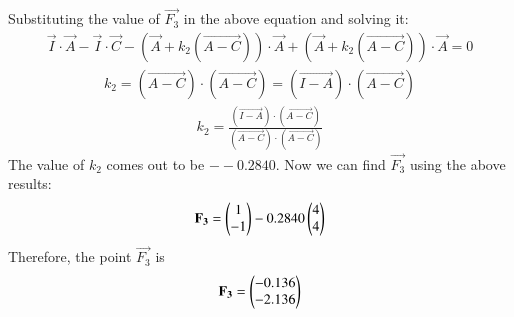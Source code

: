 \documentclass[journal,12pt,twocolumn]{IEEEtran}
\theoremstyle{remark}
\begin{document}
Substituting the value of $\vec{F_3}$ in the above equation and solving it:
\begin{align}
\vec{I}\cdot\vec{A}-\vec{I}\cdot\vec{C}-(\vec{A}+k_2(\vec{A-C}))\cdot\vec{A}+(\vec{A}+k_2(\vec{A-C}))\cdot\vec{A}=0 
\end{align}
\begin{align}
k_2=(\vec{A-C})\cdot(\vec{A-C})=(\vec{I-A})\cdot(\vec{A-C})
\end{align}
\begin{align}
k_2=\frac{(\vec{I-A})\cdot(\vec{A-C})}{(\vec{A-C})\cdot(\vec{A-C})}
\end{align}
The value of $k_2$ comes out to be $--0.2840$.
Now we can find $\vec{F_3}$ using the above results:
\begin{align}
\mathbf{F_3}=\begin{pmatrix}1\\-1\end{pmatrix}-0.2840\begin{pmatrix}4\\4\end{pmatrix}
\end{align}
Therefore, the point $\vec{F_3}$ is
\begin{align}
\mathbf{F_3}=\begin{pmatrix}-0.136\\-2.136\end{pmatrix}
\end{align}
\end{document}

